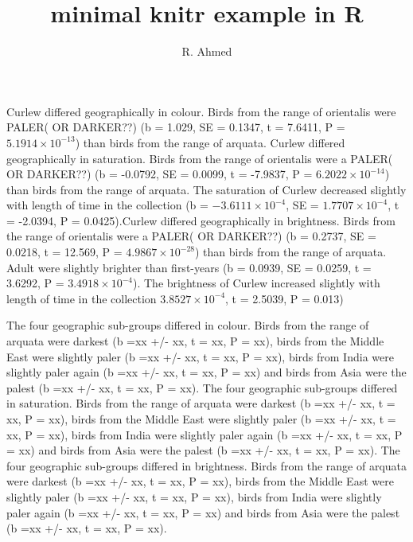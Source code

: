 \documentclass{article}\usepackage{graphicx, color}
\begin{document}
\title{minimal knitr example in R}
\author{R. Ahmed}
\maketitle    
Curlew differed geographically in colour. Birds from the range of orientalis were PALER( OR DARKER??) (b = 1.029, SE = 0.1347, t = 7.6411, P = $5.1914\times 10^{-13}$) than birds from the range of arquata. Curlew differed geographically in saturation. Birds from the range of orientalis were a PALER( OR DARKER??) (b = -0.0792, SE = 0.0099, t = -7.9837, P = $6.2022\times 10^{-14}$) than birds from the range of arquata. The saturation of Curlew decreased slightly with length of time in the collection (b = $-3.6111\times 10^{-4}$, SE = $1.7707\times 10^{-4}$, t = -2.0394, P = 0.0425).Curlew differed geographically in brightness. Birds from the range of orientalis were a PALER( OR DARKER??) (b = 0.2737, SE = 0.0218, t = 12.569, P = $4.9867\times 10^{-28}$) than birds from the range of arquata. Adult were slightly brighter than first-years (b = 0.0939, SE = 0.0259, t = 3.6292, P = $3.4918\times 10^{-4}$). The brightness of Curlew increased slightly with length of time in the collection $3.8527\times 10^{-4}$, t = 2.5039, P = 0.013) %


The four geographic sub-groups differed in colour. Birds from the range of arquata were darkest  (b =xx +/- xx, t = xx, P = xx), birds from the Middle East were slightly paler  (b =xx +/- xx, t = xx, P = xx), birds from India were slightly paler again  (b =xx +/- xx, t = xx, P = xx) and birds from Asia were the palest (b =xx +/- xx, t = xx, P = xx). The four geographic sub-groups differed in saturation. Birds from the range of arquata were darkest  (b =xx +/- xx, t = xx, P = xx), birds from the Middle East were slightly paler  (b =xx +/- xx, t = xx, P = xx), birds from India were slightly paler again  (b =xx +/- xx, t = xx, P = xx) and birds from Asia were the palest (b =xx +/- xx, t = xx, P = xx). The four geographic sub-groups differed in brightness. Birds from the range of arquata were darkest  (b =xx +/- xx, t = xx, P = xx), birds from the Middle East were slightly paler  (b =xx +/- xx, t = xx, P = xx), birds from India were slightly paler again  (b =xx +/- xx, t = xx, P = xx) and birds from Asia were the palest (b =xx +/- xx, t = xx, P = xx). 
\end{document}
